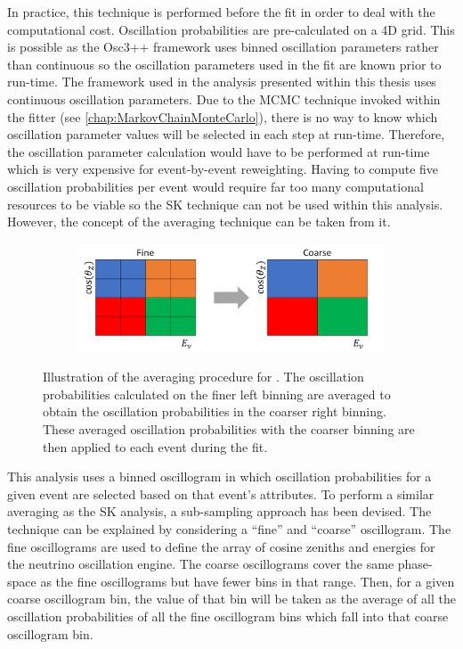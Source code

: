 In practice, this technique is performed before the fit in order to deal with the computational cost. Oscillation probabilities are pre-calculated on a 4D grid. This is possible as the Osc3++ framework uses binned oscillation parameters rather than continuous so the oscillation parameters used in the fit are known prior to run-time. The framework used in the analysis presented within this thesis uses continuous oscillation parameters. Due to the MCMC technique invoked within the fitter (see \autoref{chap:MarkovChainMonteCarlo}), there is no way to know which oscillation parameter values will be selected in each step at run-time. Therefore, the oscillation parameter calculation would have to be performed at run-time which is very expensive for event-by-event reweighting. Having to compute five oscillation probabilities per event would require far too many computational resources to be viable so the SK technique can not be used within this analysis. However, the concept of the averaging technique can be taken from it.

\begin{figure}[h]
  \begin{subfigure}[t]{\textwidth}
    \includegraphics[width=\textwidth, trim={0mm 0mm 0mm 0mm}, clip,page=1]{Figures/Oscillation/SubSamplingExample.pdf}
  \end{subfigure}
  \caption{Illustration of the averaging procedure for . The oscillation probabilities calculated on the finer left binning are averaged to obtain the oscillation probabilities in the coarser right binning. These averaged oscillation probabilities with the coarser binning are then applied to each event during the fit.}
  \label{fig:Oscillation_SK_SubSamplingExample}
\end{figure}

This analysis uses a binned oscillogram in which oscillation probabilities for a given event are selected based on that event's attributes. To perform a similar averaging as the SK analysis, a sub-sampling approach has been devised. The technique can be explained by considering a ``fine'' and ``coarse'' oscillogram. The fine oscillograms are used to define the array of cosine zeniths and energies for the neutrino oscillation engine. The coarse oscillograms cover the same phase-space as the fine oscillograms but have fewer bins in that range. Then, for a given coarse oscillogram bin, the value of that bin will be taken as the average of all the oscillation probabilities of all the fine oscillogram bins which fall into that coarse oscillogram bin.

